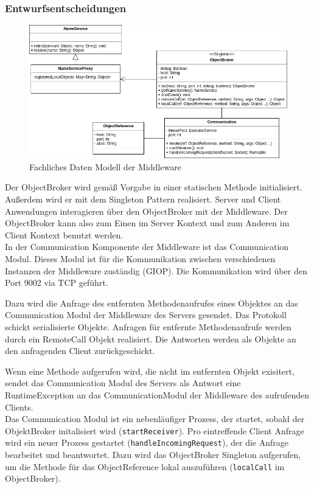 \documentclass{article}
\begin{document}
\subsubsection{Entwurfsentscheidungen}
\begin{figure}[H]
    \centering
    \includegraphics[width=\textwidth]{Middleware_FDM.png}
    \caption[fdm-middleware]{Fachliches Daten Modell der Middleware}
    \label{fig:fdm-middleware}
\end{figure}

Der ObjectBroker wird gemäß Vorgabe in einer statischen Methode initialisiert. Außerdem wird er mit dem
Singleton Pattern realisiert. Server und Client Anwendungen interagieren über den ObjectBroker mit der Middleware.
Der ObjectBroker kann also zum Einen im Server Kontext und zum Anderen im Client Kontext benutzt werden.\\

In der Communication Komponente der Middleware ist das Communication Modul. Dieses Modul ist für die Kommunikation
zwischen verschiedenen Instanzen der Middleware zuständig (GIOP). Die Kommunikation wird über den Port 9002 via TCP
geführt.

Dazu wird die Anfrage des entfernten Methodenaufrufes eines Objektes an das Communication Modul der Middleware des
Servers gesendet. Das Protokoll schickt serialisierte Objekte. Anfragen für entfernte Methodenaufrufe werden durch ein
RemoteCall Objekt realisiert. Die Antworten werden als Objekte an den anfragenden Client zurückgeschickt.

Wenn eine Methode aufgerufen wird, die nicht im entfernten Objekt exisitert, sendet das Communication Modul des Servers
als Antwort eine RuntimeException an das CommunicationModul der Middleware des aufrufenden Clients.\\

Das Communication Modul ist ein nebenläufiger Prozess, der startet, sobald der ObjektBroker initalisiert wird
(\texttt{startReceiver}). Pro eintreffende Client Anfrage wird ein neuer Prozess gestartet
(\texttt{handleIncomingRequest}), der die Anfrage bearbeitet und beantwortet. Dazu wird das ObjectBroker Singleton
aufgerufen, um die Methode für das ObjectReference lokal auszuführen (\texttt{localCall} im ObjectBroker).\\
\end{document}
